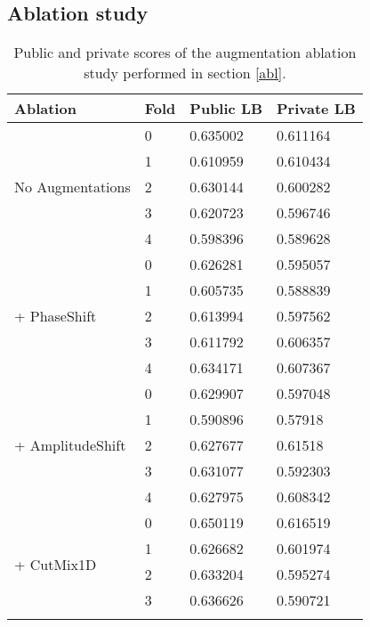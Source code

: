 \subsection{Ablation study}
\begin{table}[h!]
\caption{Public and private scores of the augmentation ablation study performed in section \ref{abl}.}
\begin{tabular}{|l|l|l|l|}
\hline
Ablation                   & Fold & Public LB & Private LB \\ \hline
\multirow{5}{*}{No Augmentations} & 0    & 0.635002  & 0.611164   \\ \cline{2-4} 
                           & 1    & 0.610959  & 0.610434   \\ \cline{2-4} 
                           & 2    & 0.630144  & 0.600282   \\ \cline{2-4} 
                           & 3    & 0.620723  & 0.596746   \\ \cline{2-4} 
                           & 4    & 0.598396  & 0.589628   \\ \hline
\multirow{5}{*}{+ PhaseShift}   & 0    & 0.626281  & 0.595057   \\ \cline{2-4} 
& 1    & 0.605735  & 0.588839   \\ \cline{2-4} 
& 2    & 0.613994  & 0.597562   \\ \cline{2-4} 
& 3    & 0.611792  & 0.606357   \\ \cline{2-4} 
& 4    & 0.634171  & 0.607367   \\ \hline
\multirow{5}{*}{+ AmplitudeShift}   & 0    & 0.629907  & 0.597048   \\ \cline{2-4} 
                           & 1    & 0.590896  & 0.57918    \\ \cline{2-4} 
                           & 2    & 0.627677  & 0.61518    \\ \cline{2-4} 
                           & 3    & 0.631077  & 0.592303   \\ \cline{2-4} 
                           & 4    & 0.627975  & 0.608342   \\ \hline
\multirow{5}{*}{+ CutMix1D}     & 0    & 0.650119  & 0.616519   \\ \cline{2-4} 
                           & 1    & 0.626682  & 0.601974   \\ \cline{2-4} 
                           & 2    & 0.633204  & 0.595274   \\ \cline{2-4} 
                           & 3    & 0.636626  & 0.590721   \\ \cline{2-4} 

\end{tabular}
\end{table}
